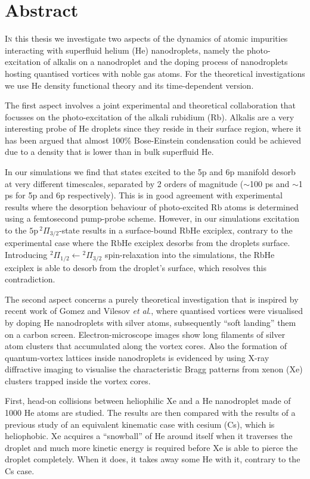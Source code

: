 \chapter{Abstract}
	\lettrine[lines=4]{\color{activeColor}I}{n} this thesis we investigate two aspects of the dynamics of atomic impurities interacting with superfluid helium (He) nanodroplets, namely the photo-excitation of alkalis on a nanodroplet and the doping process of nanodroplets hosting quantised vortices with noble gas atoms. For the theoretical investigations we use He density functional theory and its time-dependent version.

	The first aspect involves a joint experimental and theoretical collaboration that focusses on the photo-excitation of the alkali rubidium (Rb). Alkalis are a very interesting probe of He droplets since they reside in their surface region, where it has been argued that almost 100\% Bose-Einstein condensation could be achieved due to a density that is lower than in bulk superfluid He.

	In our simulations we find that states excited to the 5p and 6p manifold desorb at very different timescales, separated by 2 orders of magnitude ($\sim$100 ps and $\sim$1 ps for 5p and 6p respectively). This is in good agreement with experimental results where the desorption behaviour of photo-excited Rb atoms is determined using a femtosecond pump-probe scheme. However, in our simulations excitation to the $5\mathrm{p}\,^2\Pi_{3/2}$-state results in a surface-bound RbHe exciplex, contrary to the experimental case where the RbHe exciplex desorbs from the droplets surface. Introducing $^2\Pi_{1/2}\leftarrow{^2}\Pi_{3/2}$ spin-relaxation into the simulations, the RbHe exciplex is able to desorb from the droplet's surface, which resolves this contradiction.

	The second aspect concerns a purely theoretical investigation that is inspired by recent work of Gomez and Vilesov \emph{et al}., where quantised vortices were visualised by doping He nanodroplets with silver atoms, subsequently ``soft landing'' them on a carbon screen. Electron-microscope images show long filaments of silver atom clusters that accumulated along the vortex cores. Also the formation of quantum-vortex lattices inside nanodroplets is evidenced by using X-ray diffractive imaging to visualise the characteristic Bragg patterns from xenon (Xe) clusters trapped inside the vortex cores.

	First, head-on collisions between heliophilic Xe and a He nanodroplet made of 1000 He atoms are studied. The results are then compared with the results of a previous study of an equivalent kinematic case with cesium (Cs), which is heliophobic. Xe acquires a ``snowball'' of He around itself when it traverses the droplet and much more kinetic energy is required before Xe is able to pierce the droplet completely. When it does, it takes away some He with it, contrary to the Cs case.

